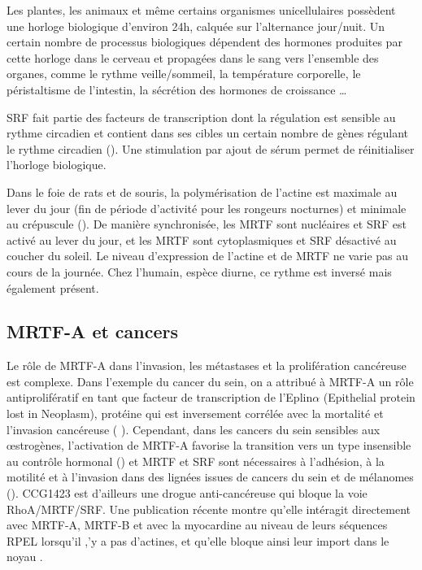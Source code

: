 Les plantes, les animaux et même certains organismes unicellulaires possèdent une horloge biologique d'environ 24h, calquée sur l'alternance jour/nuit. Un certain nombre de processus biologiques dépendent des hormones produites par cette horloge dans le cerveau et propagées dans le sang vers l'ensemble des organes, comme le rythme veille/sommeil, la température corporelle, le péristaltisme de l'intestin, la sécrétion des hormones de croissance \dots 

SRF fait partie des facteurs de transcription dont la régulation est sensible au rythme circadien et contient dans ses cibles un certain nombre de gènes régulant le rythme circadien (\cite{esnault_rho-actin_2014}). Une stimulation par ajout de sérum permet de réinitialiser l'horloge biologique.

Dans le foie de rats et de souris, la polymérisation de l'actine est maximale au lever du jour (fin de période d'activité pour les rongeurs nocturnes) et minimale au crépuscule (\cite{gerber_blood-borne_2013}). De manière synchronisée, les MRTF sont nucléaires et SRF est activé au lever du jour, et les MRTF sont cytoplasmiques et SRF désactivé au coucher du soleil. Le niveau d'expression de l'actine et de MRTF ne varie pas au cours de la journée. Chez l'humain, espèce diurne, ce rythme est inversé mais également présent. 



\subsection{MRTF-A et cancers}
Le rôle de MRTF-A dans l'invasion, les métastases et la prolifération cancéreuse est complexe. 
Dans l'exemple du cancer du sein, on a attribué à MRTF-A un rôle antiprolifératif en tant que facteur de transcription de l'Eplin$\alpha$ (Epithelial protein lost in Neoplasm), protéine qui est inversement corrélée avec la mortalité et l'invasion cancéreuse ( \cite{leitner_epithelial_2010}).
Cependant, dans les cancers du sein sensibles aux \oe strogènes, l'activation de MRTF-A favorise la transition vers un type insensible au contrôle hormonal (\cite{kerdivel_activation_2014}) et MRTF et SRF sont nécessaires à l'adhésion, à la motilité et à l'invasion dans des lignées issues de cancers du sein et de mélanomes (\cite{medjkane_myocardin-related_2009}). CCG1423 est d'ailleurs une drogue anti-cancéreuse qui bloque la voie RhoA/MRTF/SRF. Une publication récente montre qu'elle intéragit directement avec MRTF-A, MRTF-B et avec la myocardine au niveau de leurs séquences RPEL lorsqu'il ,'y a pas d'actines, et qu'elle bloque ainsi leur import dans le noyau \cite{hayashi_differences_2013}. 
 

